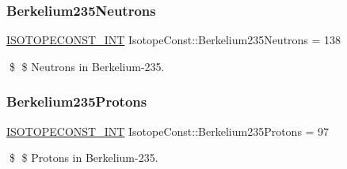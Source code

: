 \subsubsection{\texorpdfstring{Berkelium235\+Neutrons}{Berkelium235Neutrons}}
{\footnotesize\ttfamily \mbox{\hyperlink{group___isotope_const-_macros_ga5f18360b3e99483a35c32d789e62621c}{I\+S\+O\+T\+O\+P\+E\+C\+O\+N\+S\+T\+\_\+\+I\+NT}} Isotope\+Const\+::\+Berkelium235\+Neutrons = 138}

\$ \$ Neutrons in Berkelium-\/235. \mbox{\label{group___isotope_const-_berkelium-_bk235_gafb34bb42d9ba55870d48588672130816}} 
\subsubsection{\texorpdfstring{Berkelium235\+Protons}{Berkelium235Protons}}
{\footnotesize\ttfamily \mbox{\hyperlink{group___isotope_const-_macros_ga5f18360b3e99483a35c32d789e62621c}{I\+S\+O\+T\+O\+P\+E\+C\+O\+N\+S\+T\+\_\+\+I\+NT}} Isotope\+Const\+::\+Berkelium235\+Protons = 97}

\$ \$ Protons in Berkelium-\/235. 